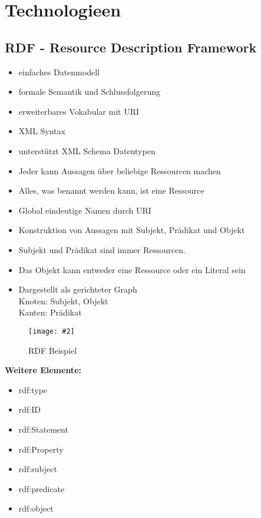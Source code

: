 \documentclass[a4paper,10pt,titlepage=false]{scrreprt}
\newcommand{\pic}[2][figure]{\begin{figure}[h]
 \centering
 \texttt{[image: \#2]}
 \caption{#1}
\end{figure}
}
\begin{document}

\section{Technologieen} %
\label{sec:technologieen}

\subsection{RDF - Resource Description Framework} %
\label{sub:rdf_resource_description_framework}
\begin{itemize}
  \item einfaches Datenmodell
\item formale Semantik und Schlussfolgerung
\item erweiterbares Vokabular mit URI
\item XML Syntax
\item unterstützt XML Schema Datentypen
\item Jeder kann Aussagen über beliebige Ressourcen
machen
\item Alles, was benannt werden kann, ist eine Ressource
\item Global eindeutige Namen durch URI
\item Konstruktion von Aussagen mit Subjekt, Prädikat und
Objekt
\item Subjekt und Prädikat sind immer Ressourcen.
\item Das Objekt kann entweder eine Ressource oder ein
Literal sein
\item Dargestellt als gerichteter Graph\\
Knoten: Subjekt, Objekt\\
Kanten: Prädikat\\

\end{itemize}
\pic[RDF Beispiel]{rdf.png}

\textbf{Weitere Elemente:}
\begin{itemize}
  \item rdf:type
\item rdf:ID
\item rdf:Statement
\item rdf:Property
\item rdf:subject
\item rdf:predicate
\item rdf:object
\end{itemize}
\end{document}
